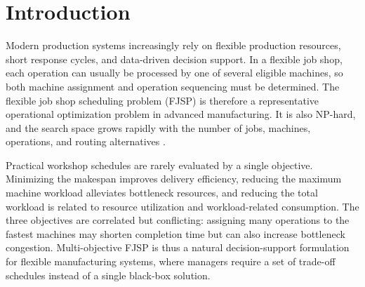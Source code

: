 \documentclass[pdflatex,iicol,Numbered,sn-basic]{sn-jnl}
\begin{document}

\maketitle

\section{Introduction}\label{sec:intro}
Modern production systems increasingly rely on flexible production resources, short response cycles, and data-driven decision support.
In a flexible job shop, each operation can usually be processed by one of several eligible machines, so both machine assignment and operation sequencing must be determined.
The flexible job shop scheduling problem (FJSP) is therefore a representative operational optimization problem in advanced manufacturing.
It is also NP-hard, and the search space grows rapidly with the number of jobs, machines, operations, and routing alternatives \cite{garey1976complexity,li2022survey}.

Practical workshop schedules are rarely evaluated by a single objective. Minimizing the makespan improves delivery efficiency, reducing the maximum machine workload alleviates bottleneck resources, and reducing the total workload is related to resource utilization and workload-related consumption.
The three objectives are correlated but conflicting: assigning many operations to the fastest machines may shorten completion time but can also increase bottleneck congestion.
Multi-objective FJSP is thus a natural decision-support formulation for flexible manufacturing systems, where managers require a set of trade-off schedules instead of a single black-box solution.
\end{document}
